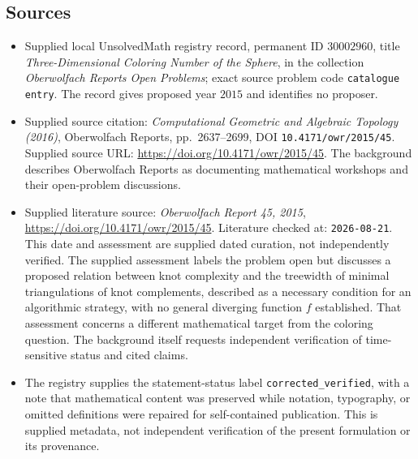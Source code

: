 \documentclass[11pt]{article}
\begin{document}
\subsection{Sources}
\begin{itemize}
\item Supplied local UnsolvedMath registry record, permanent ID \(30002960\), title \emph{Three-Dimensional Coloring Number of the Sphere}, in the collection \emph{Oberwolfach Reports Open Problems}; exact source problem code \texttt{catalogue entry}. The record gives proposed year \(2015\) and identifies no proposer.
\item Supplied source citation: \emph{Computational Geometric and Algebraic Topology (2016)}, Oberwolfach Reports, pp.\ 2637--2699, DOI \texttt{10.4171/owr/2015/45}. Supplied source URL: \url{https://doi.org/10.4171/owr/2015/45}. The background describes Oberwolfach Reports as documenting mathematical workshops and their open-problem discussions.
\item Supplied literature source: \emph{Oberwolfach Report 45, 2015}, \url{https://doi.org/10.4171/owr/2015/45}. Literature checked at: \texttt{2026-08-21}. This date and assessment are supplied dated curation, not independently verified. The supplied assessment labels the problem open but discusses a proposed relation between knot complexity and the treewidth of minimal triangulations of knot complements, described as a necessary condition for an algorithmic strategy, with no general diverging function \(f\) established. That assessment concerns a different mathematical target from the coloring question. The background itself requests independent verification of time-sensitive status and cited claims.
\item The registry supplies the statement-status label \texttt{corrected\_verified}, with a note that mathematical content was preserved while notation, typography, or omitted definitions were repaired for self-contained publication. This is supplied metadata, not independent verification of the present formulation or its provenance.
\end{itemize}
\end{document}
